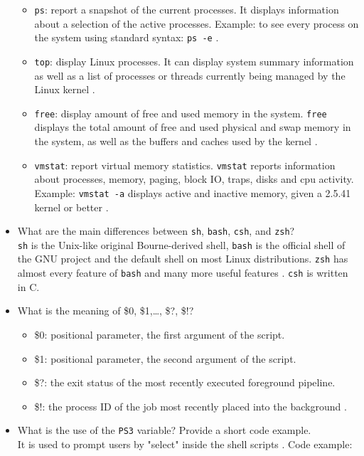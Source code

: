 \documentclass[a4paper]{article}
\begin{document}
\begin{itemize}
\begin{itemize}
        \item \texttt{ps}: report a snapshot of the current processes. It displays information about a selection of the active processes. Example: to see every process on the system using standard syntax: \texttt{ps -e} \cite{ps}.
        \item \texttt{top}: display Linux processes. It can display system summary information as well as a list of processes or threads currently being managed by the Linux kernel \cite{top}.
        \item \texttt{free}: display amount of free and used memory in the system. \texttt{free} displays the total amount of free and used physical and swap memory in the system, as well as the buffers and caches used by the kernel \cite{free}.
        \item \texttt{vmstat}: report virtual memory statistics. \texttt{vmstat} reports information about processes, memory, paging, block IO, traps, disks and cpu activity. Example: \texttt{vmstat -a} displays active and inactive memory, given a 2.5.41 kernel or better \cite{vmstat}.
    \end{itemize}
    \item What are the main differences between \texttt{sh}, \texttt{bash}, \texttt{csh}, and \texttt{zsh}?\\\texttt{sh} is the Unix-like original Bourne-derived shell, \texttt{bash} is the official shell of the GNU project and the default shell on most Linux distributions. \texttt{zsh} has almost every feature of \texttt{bash} and many more useful features \cite{sh}. \texttt{csh} is written in C.
    \item What is the meaning of \$0, \$1,…, \$?, \$!?
    \begin{itemize}
        \item \$0: positional parameter, the first argument of the script.
        \item \$1: positional parameter, the second argument of the script.
        \item \$?: the exit status of the most recently executed foreground pipeline.
        \item \$!: the process ID of the job most recently placed into the background \cite{specpar}.
    \end{itemize}
    \item What is the use of the \texttt{PS3} variable? Provide a short code example.\\It is used to prompt users by "select" inside the shell scripts \cite{ps3var}. Code example:

\end{itemize}
\end{document}
